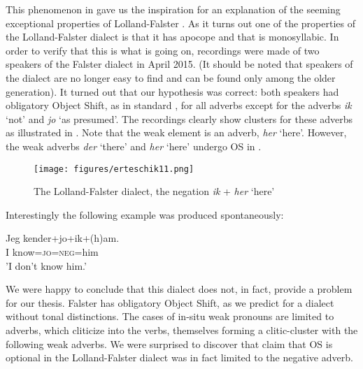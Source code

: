 \documentclass[output=paper]{LSP/langsci}
\begin{document}
This phenomenon in  gave us the inspiration for an explanation of the seeming exceptional properties of Lolland-Falster . As it turns out one of the properties of the Lolland-Falster dialect is that it has apocope and that  is monosyllabic. In order to verify that this is what is going on, recordings were made of two speakers of the Falster dialect in April 2015. (It should be noted that speakers of the dialect are no longer easy to find and can be found only among the older generation). It turned out that our hypothesis was correct: both speakers had obligatory Object Shift, as in standard , for all adverbs except for the  adverbs \textit{ik} ‘not’ and \textit{jo} ‘as presumed’. The recordings clearly show  clusters for these adverbs as illustrated in . Note that the weak element is an adverb, \textit{her} ‘here’. However, the weak adverbs \textit{der} ‘there’ and \textit{her} ‘here’ undergo OS in . 

  

 
\begin{figure}
\texttt{[image: figures/erteschik11.png]}
\caption{The Lolland-Falster dialect, the negation \textit{ik} + \textit{her} ‘here’}
\label{fig:erteschik:11}
\end{figure}

Interestingly the following example was produced spontaneously:

\ea%
\label{ex:erteschik:7}
\gll Jeg   kender+jo+ik+(h)am. \\
     I     know=\textsc{jo}=\textsc{neg}=him\\
    \glt ’I don’t know him.’
    \z

We were happy to conclude that this  dialect does not, in fact, provide a problem for our thesis. Falster  has obligatory Object Shift, as we predict for a dialect without tonal distinctions. The cases of in-situ weak pronouns are limited to  adverbs, which cliticize into the verbs, themselves forming a clitic-cluster with the following weak adverbs. We were surprised to discover that  claim that OS is optional in the Lolland-Falster dialect was in fact limited to the negative adverb.
\end{document}
